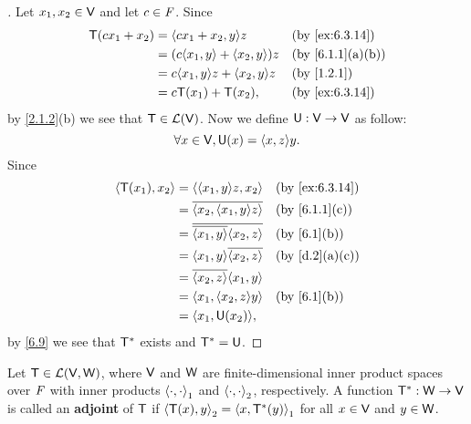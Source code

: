 \begin{proof}[]
  Let \(x_1, x_2 \in \mathsf{V}\) and let \(c \in \mathit{F}\).
  Since
  \begin{align*}
    \T(c x_1 + x_2) & = \inn{c x_1 + x_2, y} z            &  & \by{ex:6.3.14}  \\
                    & = (c \inn{x_1, y} + \inn{x_2, y}) z &  & \by{6.1.1}[a,b] \\
                    & = c \inn{x_1, y} z + \inn{x_2, y} z &  & \by{1.2.1}      \\
                    & = c \T(x_1) + \T(x_2),              &  & \by{ex:6.3.14}
  \end{align*}
  by \cref{2.1.2}(b) we see that \(\mathsf{T} \in \mathcal{L}(\mathsf{V})\).
  Now we define \(\mathsf{U} : \mathsf{V} \to \mathsf{V}\) as follow:
  \[
    \forall x \in \V, \U(x) = \inn{x, z} y.
  \]
  Since
  \begin{align*}
    \inn{\T(x_1), x_2} & = \inn{\inn{x_1, y} z, x_2}               &  & \by{ex:6.3.14} \\
                       & = \conj{\inn{x_2, \inn{x_1, y} z}}        &  & \by{6.1.1}[c]  \\
                       & = \conj{\conj{\inn{x_1, y}} \inn{x_2, z}} &  & \by{6.1}[b]    \\
                       & = \inn{x_1, y} \conj{\inn{x_2, z}}        &  & \by{d.2}[a,c]  \\
                       & = \conj{\inn{x_2, z}} \inn{x_1, y}                            \\
                       & = \inn{x_1, \inn{x_2, z} y}               &  & \by{6.1}[b]    \\
                       & = \inn{x_1, \U(x_2)},
  \end{align*}
  by \cref{6.9} we see that \(\mathsf{T}^*\) exists and \(\mathsf{T}^* = \mathsf{U}\).
\end{proof}

\begin{defn}\label{6.3.8}
  Let \(\mathsf{T} \in \mathcal{L}(\mathsf{V}, \mathsf{W})\), where \(\mathsf{V}\) and \(\mathsf{W}\) are finite-dimensional inner product spaces over \(\mathit{F}\) with inner products \(\left\langle\cdot, \cdot\right\rangle_1\) and \(\left\langle\cdot, \cdot\right\rangle_2\), respectively.
  A function \(\mathsf{T}^* : \mathsf{W} \to \mathsf{V}\) is called an \textbf{adjoint} of \(\mathsf{T}\) if \(\left\langle\mathsf{T}(x), y\right\rangle_2 = \left\langle x, \mathsf{T}^*(y)\right\rangle_1\) for all \(x \in \mathsf{V}\) and \(y \in \mathsf{W}\).
\end{defn}


